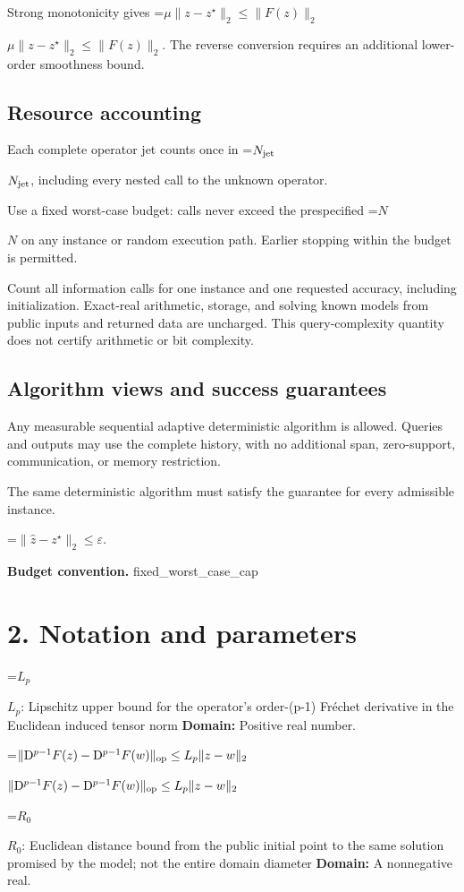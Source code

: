 \documentclass[10pt,a4paper]{article}
\newcommand{\AtlasMath}[1]{\par\begingroup\centering\setbox0=\hbox{$\displaystyle #1$}\ifdim\wd0>1.4\linewidth\typeout{ATLAS WIDE FORMULA: \the\wd0}\fi\ifdim\wd0>\linewidth\resizebox{\linewidth}{!}{\box0}\else\box0\fi\par\endgroup}
\newcommand{\AtlasInlineMath}[1]{\begingroup\setbox0=\hbox{$#1$}\ifdim\wd0>.4\linewidth\endgroup\AtlasMath{#1}\else\endgroup$#1$\fi}
\begin{document}
Strong monotonicity gives \AtlasInlineMath{\mu\|z-z^\star\|_2\le\|F(z)\|_2}. The reverse conversion requires an additional lower-order smoothness bound.

\subsection{Resource accounting}
Each complete operator jet counts once in \AtlasInlineMath{N_{\rm jet}}, including every nested call to the unknown operator.

Use a fixed worst-case budget: calls never exceed the prespecified \AtlasInlineMath{N} on any instance or random execution path. Earlier stopping within the budget is permitted.

Count all information calls for one instance and one requested accuracy, including initialization. Exact-real arithmetic, storage, and solving known models from public inputs and returned data are uncharged. This query-complexity quantity does not certify arithmetic or bit complexity.

\subsection{Algorithm views and success guarantees}
Any measurable sequential adaptive deterministic algorithm is allowed. Queries and outputs may use the complete history, with no additional span, zero-support, communication, or memory restriction.

The same deterministic algorithm must satisfy the guarantee for every admissible instance.


\AtlasMath{\|\widehat{z}-z^\star\|_2\le\varepsilon.}


\textbf{Budget convention.} fixed\_worst\_case\_cap

\section{2. Notation and parameters}
\AtlasInlineMath{L_p}: Lipschitz upper bound for the operator's order-(p-1) Fréchet derivative in the Euclidean induced tensor norm \textbf{Domain:} Positive real number.

\AtlasInlineMath{\|\mathrm D^{p-1}F(z)-\mathrm D^{p-1}F(w)\|_{\rm op}\le L_p\|z-w\|_2}

\AtlasInlineMath{R_0}: Euclidean distance bound from the public initial point to the same solution promised by the model; not the entire domain diameter \textbf{Domain:} A nonnegative real.
\end{document}
